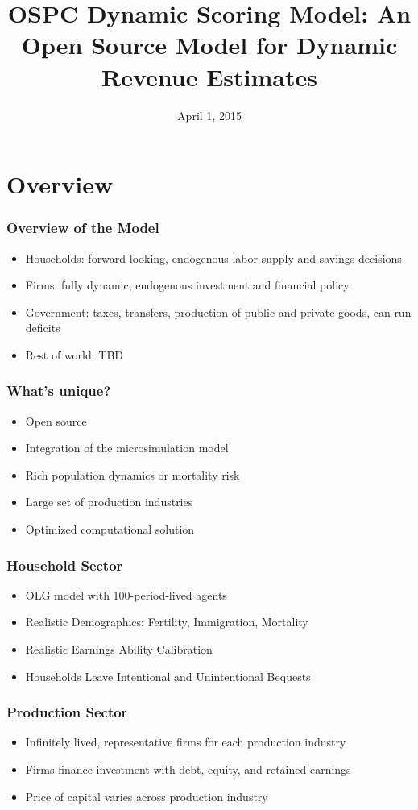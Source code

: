 \documentclass{beamer}
\title[OSPC Dynamic Scoring Model]
{OSPC Dynamic Scoring Model: An Open Source Model for Dynamic Revenue Estimates}
\date[Short Occasion] %
{April 1, 2015}
\begin{document}
\begin{frame}
  \titlepage
\end{frame}

\section{Overview}
  \begin{frame}
    \frametitle{Overview of the Model}
    \begin{itemize}
      \item Households: forward looking, endogenous labor supply and savings decisions
      \item Firms: fully dynamic, endogenous investment and financial policy
      \item Government: taxes, transfers, production of public and private goods, can run deficits
      \item Rest of world: TBD
    \end{itemize}
  \end{frame}
  
  
    \begin{frame}
    \frametitle{What's unique?}
    \begin{itemize}
      \item Open source
      \item Integration of the microsimulation model
      \item Rich population dynamics or mortality risk
      \item Large set of production industries
      \item Optimized computational solution
    \end{itemize}
  \end{frame}
  
    \begin{frame}
    \frametitle{Household Sector}
    \begin{itemize}
      \item OLG model with 100-period-lived agents
      \item Realistic Demographics: Fertility, Immigration, Mortality
      \item Realistic Earnings Ability Calibration
      \item Households Leave Intentional and Unintentional Bequests
    \end{itemize}
  \end{frame}
  
  
      \begin{frame}
    \frametitle{Production Sector}
    \begin{itemize}
      \item Infinitely lived, representative firms for each production industry 
      \item Firms finance investment with debt, equity, and retained earnings
      \item Price of capital varies across production industry
    \end{itemize}
  \end{frame}
  
\end{document}
